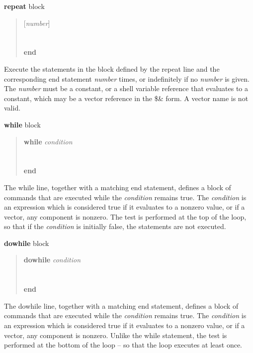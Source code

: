 \begin{description}
\item{{\bf repeat} block}\\

\begin{quote}
{ [{\it number\/}]}\\
\\
\\
{\bf\vt end}
\end{quote}
Execute the statements in the block defined by the {\et repeat} line
and the corresponding {\et end} statement {\it number\/} times, or
indefinitely if no {\it number} is given.  The {\it number} must be a
constant, or a shell variable reference that evaluates to a constant,
which may be a vector reference in the {\vt \$\&} form.  A vector name
is not valid.

\item{{\bf while} block}\\

\begin{quote}
{\bf\vt while} {\it condition}\\
\\
\\
{\bf\vt end}
\end{quote}
The {\et while} line, together with a matching {\et end} statement,
defines a block of commands that are executed while the {\it
condition} remains true.  The {\it condition} is an expression which
is considered true if it evaluates to a nonzero value, or if a vector,
any component is nonzero.  The test is performed at the top of the
loop, so that if the {\it condition} is initially false, the
statements are not executed.

\item{{\bf dowhile} block}\\

\begin{quote}
{\bf\vt dowhile} {\it condition}\\
\\
\\
{\bf\vt end}
\end{quote}
The {\et dowhile} line, together with a matching {\et end} statement,
defines a block of commands that are executed while the {\it
condition} remains true.  The {\it condition} is an expression which
is considered true if it evaluates to a nonzero value, or if a vector,
any component is nonzero.  Unlike the {\et while} statement, the test
is performed at the bottom of the loop -- so that the loop executes at
least once.


\end{description}
